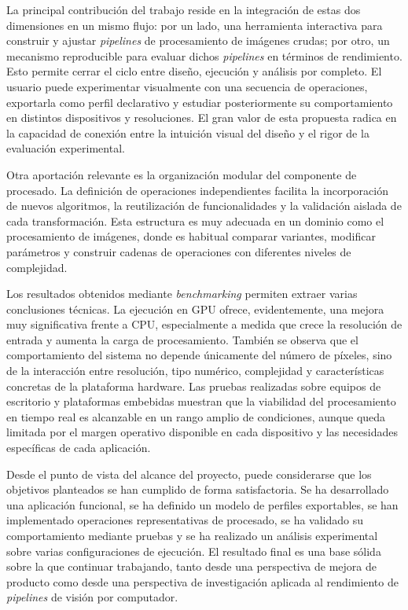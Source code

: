 La principal contribución del trabajo reside en la integración de estas dos dimensiones en un
mismo flujo: por un lado, una herramienta interactiva para construir y ajustar \textit{pipelines}
de procesamiento de imágenes crudas; por otro, un mecanismo reproducible para evaluar dichos
\textit{pipelines} en términos de rendimiento. Esto permite cerrar el ciclo entre
diseño, ejecución y análisis por completo. El usuario puede experimentar visualmente con una secuencia de
operaciones, exportarla como perfil declarativo y estudiar posteriormente su comportamiento en
distintos dispositivos y resoluciones. El gran valor de esta propuesta radica en la capacidad de 
conexión entre la intuición visual del diseño y el rigor de la evaluación experimental.

Otra aportación relevante es la organización modular del componente de procesado. La definición de
operaciones independientes facilita la incorporación de nuevos algoritmos, la reutilización de
funcionalidades y la validación aislada de cada transformación. Esta estructura es muy
adecuada en un dominio como el procesamiento de imágenes, donde es habitual comparar variantes,
modificar parámetros y construir cadenas de operaciones con diferentes niveles de complejidad. 

\newpage

Los resultados obtenidos mediante \textit{benchmarking} permiten extraer varias conclusiones técnicas.
La ejecución en GPU ofrece, evidentemente, una mejora muy significativa frente a CPU, especialmente a medida que crece
la resolución de entrada y aumenta la carga de procesamiento. También se observa que el comportamiento
del sistema no depende únicamente del número de píxeles, sino de la interacción entre resolución,
tipo numérico, complejidad y características concretas de la plataforma hardware.
Las pruebas realizadas sobre equipos de escritorio y plataformas embebidas muestran que la viabilidad
del procesamiento en tiempo real es alcanzable en un rango amplio de condiciones, aunque queda
limitada por el margen operativo disponible en cada dispositivo y las necesidades específicas de cada 
aplicación.

Desde el punto de vista del alcance del proyecto, puede considerarse que los objetivos planteados se
han cumplido de forma satisfactoria. Se ha desarrollado una aplicación funcional, se ha definido un
modelo de perfiles exportables, se han implementado operaciones representativas de procesado, se ha
validado su comportamiento mediante pruebas y se ha realizado un análisis experimental sobre varias
configuraciones de ejecución. El resultado final es una base sólida sobre la que continuar trabajando,
tanto desde una perspectiva de mejora de producto como desde una perspectiva de investigación aplicada
al rendimiento de \textit{pipelines} de visión por computador.

